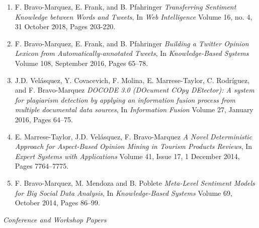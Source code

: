 \documentclass[letterpaper]{article}
\begin{document}
\begin{enumerate}

\item F. Bravo-Marquez, E. Frank, and B. Pfahringer  \textit{Transferring Sentiment Knowledge between Words and Tweets}, In \textit{Web Intelligence} Volume 16, no. 4, 31 October 2018, Pages 203-220. 


\item F. Bravo-Marquez, E. Frank, and B. Pfahringer \textit{Building a Twitter Opinion Lexicon from Automatically-annotated Tweets}, In \textit{Knowledge-Based Systems}  Volume 108, September 2016, Pages 65–78.

\item J.D. Velásquez, Y. Covacevich, F. Molina, E. Marrese-Taylor, C. Rodríguez, and F. Bravo-Marquez \textit{DOCODE 3.0 (DOcument COpy DEtector): A system for plagiarism detection by applying an information fusion process from multiple documental data sources}, In \textit{Information Fusion} Volume 27, January 2016, Pages 64–75. 


\item E. Marrese-Taylor, J.D. Velásquez, F. Bravo-Marquez \textit{A Novel Deterministic Approach for Aspect-Based Opinion Mining in Tourism Products Reviews}, In \textit{Expert Systems with Applications} Volume 41, Issue 17, 1 December 2014, Pages 7764–7775. 


\item F. Bravo-Marquez, M. Mendoza and B. Poblete \textit{Meta-Level Sentiment Models for Big Social Data Analysis}, In \textit{Knowledge-Based Systems} Volume 69, October 2014, Pages 86–99. 

\end{enumerate}


\begin{flushleft}
\emph{Conference and Workshop Papers}
\end{flushleft}
\end{document}
